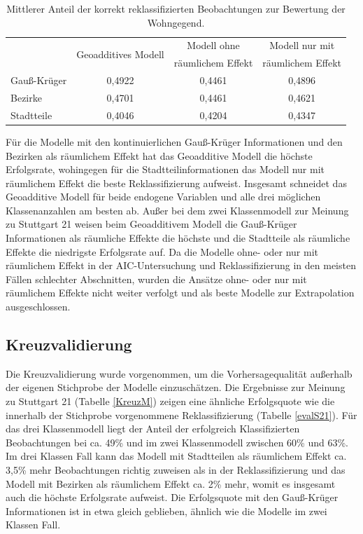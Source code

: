 \documentclass{Vorlage}
\begin{document}
\begin{table}[h]
\centering
\caption{Mittlerer Anteil der korrekt reklassifizierten Beobachtungen zur Bewertung der Wohngegend.}
\label{evalB}
\begin{tabular}{l|c|c|c}
\hline \hline
             & \multirow{2}{*}{Geoadditives Modell} & Modell ohne       & Modell nur mit    \\
             &                                      & räumlichem Effekt & räumlichem Effekt \\ \hline
Gauß-Krüger & 0,4922                               & 0,4461            & 0,4896            \\
Bezirke      & 0,4701                               & 0,4461            & 0,4621            \\
Stadtteile   & 0,4046                               & 0,4204            & 0,4347            \\ \hline \hline
\end{tabular}
\end{table}

Für die Modelle mit den kontinuierlichen Gauß-Krüger Informationen und den Bezirken als räumlichem Effekt hat das Geoadditive Modell die höchste Erfolgsrate, wohingegen für die Stadtteilinformationen das Modell nur mit räumlichem Effekt die beste Reklassifizierung aufweist. Insgesamt schneidet das Geoadditive Modell für beide endogene Variablen und alle drei möglichen Klassenanzahlen am besten ab. Außer bei dem zwei Klassenmodell zur Meinung zu Stuttgart 21 weisen beim Geoadditivem Modell die Gauß-Krüger Informationen als räumliche Effekte die höchste und die Stadtteile als räumliche Effekte die niedrigste Erfolgsrate auf. Da die Modelle ohne- oder nur mit räumlichem Effekt in der AIC-Untersuchung und Reklassifizierung in den meisten Fällen schlechter Abschnitten, wurden die Ansätze ohne- oder nur mit räumlichem Effekte nicht weiter verfolgt und als beste Modelle zur Extrapolation ausgeschlossen.

\subsection{Kreuzvalidierung}

Die Kreuzvalidierung wurde vorgenommen, um die Vorhersagequalität außerhalb der eigenen Stichprobe der Modelle einzuschätzen. Die Ergebnisse zur Meinung zu Stuttgart 21 (Tabelle \ref{KreuzM}) zeigen eine ähnliche Erfolgsquote wie die innerhalb der Stichprobe vorgenommene Reklassifizierung (Tabelle \ref{evalS21}). Für das drei Klassenmodell liegt der Anteil der erfolgreich Klassifizierten Beobachtungen bei ca. 49\% und im zwei Klassenmodell zwischen 60\% und 63\%. Im drei Klassen Fall kann das Modell mit Stadtteilen als räumlichem Effekt ca. 3,5\%  mehr Beobachtungen richtig zuweisen als in der Reklassifizierung und das Modell mit Bezirken als räumlichem Effekt ca. 2\% mehr, womit es insgesamt auch die höchste Erfolgsrate aufweist. Die Erfolgsquote mit den Gauß-Krüger Informationen ist in etwa gleich geblieben, ähnlich wie die Modelle im zwei Klassen Fall.
 
\end{document}
